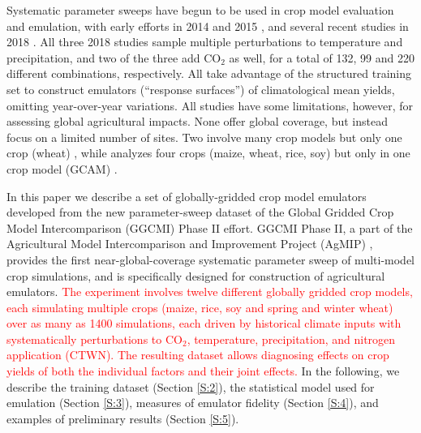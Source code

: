\documentclass[gmd, manuscript]{copernicus} %
\begin{document}
Systematic parameter sweeps have begun to be used in crop model evaluation and emulation, with early efforts in 2014 and 2015 \citep{ruane2014, Markowski2015, Pirttioja2015}, and several recent studies in 2018 \citep{FRONZEK20182, Snyder2018, RUIZRAMOS2018}. 
All three 2018 studies sample multiple perturbations to temperature and precipitation, and two of the three add CO$_2$ as well, for a total of 132, 99 and 220 different combinations, respectively. 
All take advantage of the structured training set to construct emulators (``response surfaces'') of climatological mean yields, omitting year-over-year variations. 
All studies have some limitations, however, for assessing global agricultural impacts. None offer global coverage, but instead focus on a limited number of sites. Two involve many crop models but only one crop (wheat) \citep{FRONZEK20182,RUIZRAMOS2018}, while \citet{Snyder2018} analyzes four crops (maize, wheat, rice, soy) but only in one crop model (GCAM) \citep{calvin2019}.

In this paper we describe a set of globally-gridded crop model emulators developed from the new parameter-sweep dataset of the Global Gridded Crop Model Intercomparison (GGCMI) Phase II effort. 
GGCMI Phase II, a part of the Agricultural Model Intercomparison and Improvement Project (AgMIP) \citep{ROSENZWEIG2013, Rosenzweig2014}, provides the first near-global-coverage systematic parameter sweep of multi-model crop simulations, and is specifically designed for construction of agricultural emulators. 
\textcolor{red}{The experiment involves twelve different globally gridded crop models, each simulating multiple crops (maize, rice, soy and spring and winter wheat) over as many as 1400 simulations, each driven by historical climate inputs with systematically perturbations to CO$_2$, temperature, precipitation, and nitrogen application (CTWN).
The resulting dataset allows diagnosing effects on crop yields of both the individual factors and their joint effects.}
In the following, we describe the training dataset (Section \ref{S:2}), the statistical model used for emulation (Section \ref{S:3}), measures of emulator fidelity (Section \ref{S:4}), and examples of preliminary results (Section \ref{S:5}). 


\end{document}
